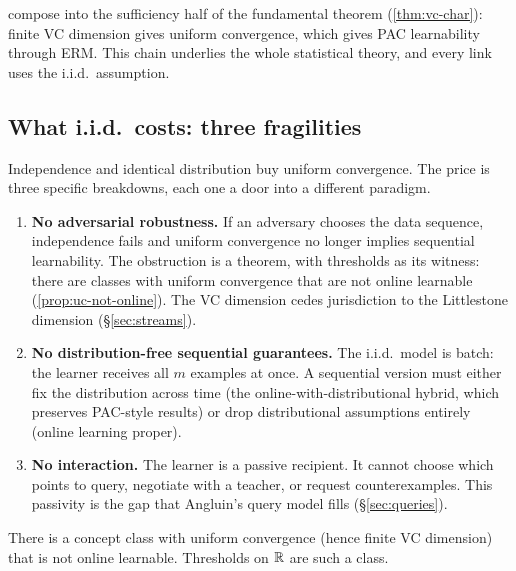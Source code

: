  compose into the sufficiency half of the fundamental theorem (\cref{thm:vc-char}): finite VC dimension gives uniform convergence, which gives PAC learnability through ERM. This chain underlies the whole statistical theory, and every link uses the i.i.d.\ assumption.

\subsection{What i.i.d.\ costs: three fragilities}
\label{subsec:iid-costs}

Independence and identical distribution buy uniform convergence. The price is three specific breakdowns, each one a door into a different paradigm.

\begin{enumerate}[leftmargin=*,itemsep=4pt]
\item \textbf{No adversarial robustness.} If an adversary chooses the data sequence, independence fails and uniform convergence no longer implies sequential learnability. The obstruction is a theorem, with thresholds as its witness: there are classes with uniform convergence that are not online learnable (\cref{prop:uc-not-online}). The VC dimension cedes jurisdiction to the Littlestone dimension (\S\ref{sec:streams}).

\item \textbf{No distribution-free sequential guarantees.} The i.i.d.\ model is batch: the learner receives all $m$ examples at once. A sequential version must either fix the distribution across time (the online-with-distributional hybrid, which preserves PAC-style results) or drop distributional assumptions entirely (online learning proper).

\item \textbf{No interaction.} The learner is a passive recipient. It cannot choose which points to query, negotiate with a teacher, or request counterexamples. This passivity is the gap that Angluin's query model fills (\S\ref{sec:queries}).
\end{enumerate}

\begin{prop}
\label{prop:uc-not-online}
There is a concept class with uniform convergence (hence finite VC dimension) that is not online learnable. Thresholds on $\mathbb{R}$ are such a class.
\end{prop}

